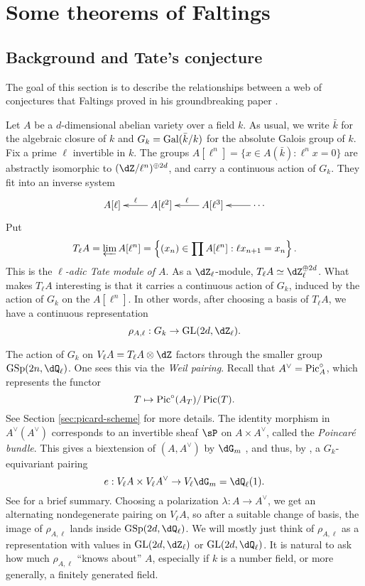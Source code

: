 




\section{Some theorems of Faltings}





\subsection{Background and Tate's conjecture}

The goal of this section is to describe the relationships between a web of 
conjectures that Faltings proved in his groundbreaking paper 
\cite{fa86}. 

Let $A$ be a $d$-dimensional abelian variety over a field $k$. As usual, we 
write $\bar k$ for the algebraic closure of $k$ and $G_k=\operatorname{Gal}(\bar k/k)$ for 
the absolute Galois group of $k$. Fix a prime $\ell$ invertible in $k$. The 
groups $A[\ell^n] = \{x\in A(\bar k):\ell^n x=0\}$ are abstractly isomorphic 
to $(\dZ/\ell^n)^{\oplus 2d}$, and carry a continuous action of $G_k$. They 
fit into an inverse system 
\[\xymatrix{
  A[\ell] 
    & A[\ell^2] \ar[l]_-\ell 
    & A[\ell^3] \ar[l]_-\ell 
    & \cdots \ar[l]
}\]
Put 
\[
  T_\ell A = \varprojlim A[\ell^n] = \left\{(x_n)\in \prod A[\ell^n] : \ell x_{n+1} = x_n\right\} \text{.}
\]
This is the \emph{$\ell$-adic Tate module of $A$}. As a $\dZ_\ell$-module, 
$T_\ell A \simeq \dZ_\ell^{\oplus 2 d}$. What makes $T_\ell A$ interesting is 
that it carries a continuous action of $G_k$, induced by the action of $G_k$ 
on the $A[\ell^n]$. In other words, after choosing a basis of $T_\ell A$, we 
have a continuous representation 
\[
  \rho_{A,\ell} : G_k \to \gl{2 d}{\dZ_\ell} \text{.}
\]

The action of $G_k$ on $V_\ell A = T_\ell A\otimes\dZ$ factors through 
the smaller group $\operatorname{GSp}(2 n,\dQ_\ell)$. One sees this via the 
\emph{Weil pairing}. Recall that $A^\vee = \operatorname{Pic}_A^\circ$, which represents 
the functor 
\[
  T \mapsto \operatorname{Pic}^\circ(A_T)/\operatorname{Pic}(T) \text{.}
\]
See Section \ref{sec:picard-scheme} for more details. The identity morphism 
in $A^\vee(A^\vee)$ corresponds to an invertible sheaf $\sP$ on 
$A\times A^\vee$, called the \emph{Poincar\'e bundle}. This gives a 
biextension of $(A,A^\vee)$ by $\dG_m$ \cite[VII 2.9.5]{gr72}, and thus, by 
\cite[VIII 2.2]{gr72}, a $G_k$-equivariant pairing 
\[
  e:V_\ell A \times V_\ell A^\vee \to V_\ell \dG_m = \dQ_\ell(1) \text{.}
\]
See \cite[IX 1.0]{gr72} for a brief summary. Choosing a polarization 
$\lambda:A \to A^\vee$, we get an alternating nondegenerate pairing on 
$V_\ell A$, so after a suitable change of basis, the image of 
$\rho_{A,\ell}$ lands inside $\operatorname{GSp}(2 d,\dQ_\ell)$. We will mostly 
just think of $\rho_{A,\ell}$ as a representation with values in 
$\gl{2d}{\dZ_\ell}$ or $\gl{2d}{\dQ_\ell}$. It is 
natural to ask how much $\rho_{A,\ell}$ ``knows about'' $A$, especially if $k$ 
is a number field, or more generally, a finitely generated field. 

